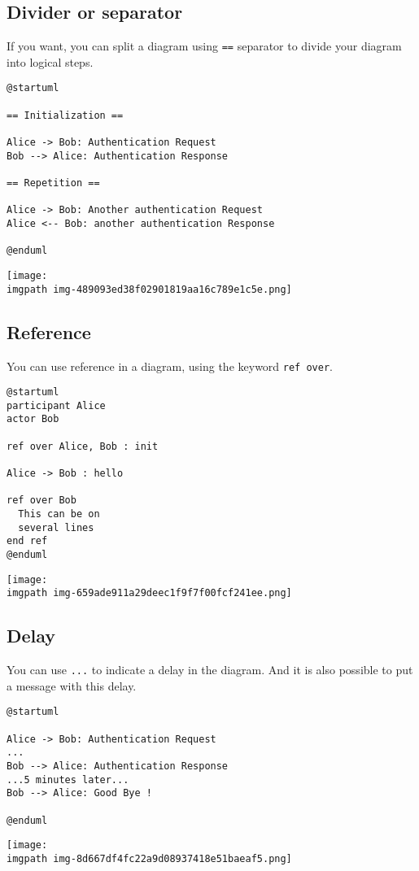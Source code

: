 %
%
\subsection{Divider or separator}




If you want, you can split a diagram using \texttt{==} separator to
divide your diagram into logical steps.
\begin{verbatim}
@startuml

== Initialization ==

Alice -> Bob: Authentication Request
Bob --> Alice: Authentication Response

== Repetition ==

Alice -> Bob: Another authentication Request
Alice <-- Bob: another authentication Response

@enduml
\end{verbatim}
\begin{center}
\texttt{[image: \\imgpath img-489093ed38f02901819aa16c789e1c5e.png]}
\end{center}
%
%
\subsection{Reference}


You can use reference in a diagram, using the keyword \texttt{ref over}.
\begin{verbatim}
@startuml
participant Alice
actor Bob

ref over Alice, Bob : init

Alice -> Bob : hello

ref over Bob
  This can be on
  several lines
end ref
@enduml
\end{verbatim}
\begin{center}
\texttt{[image: \\imgpath img-659ade911a29deec1f9f7f00fcf241ee.png]}
\end{center}


%
%
\subsection{Delay}


You can use \texttt{...} to indicate a delay in the diagram.
And it is also possible to put a message with this delay.
\begin{verbatim}
@startuml

Alice -> Bob: Authentication Request
...
Bob --> Alice: Authentication Response
...5 minutes later...
Bob --> Alice: Good Bye !

@enduml
\end{verbatim}
\begin{center}
\texttt{[image: \\imgpath img-8d667df4fc22a9d08937418e51baeaf5.png]}
\end{center}
%
%
